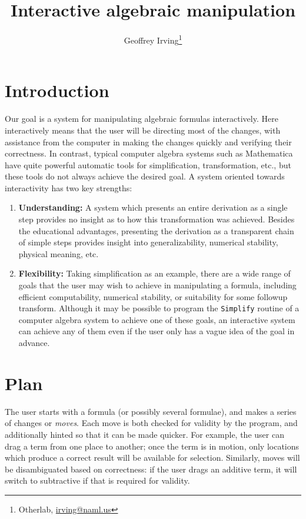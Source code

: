 \documentclass[11pt]{article}
\title{Interactive algebraic manipulation}
\author{Geoffrey Irving\thanks{Otherlab, \url{irving@naml.us}}}
\begin{document}
\maketitle

\section{Introduction}

Our goal is a system for manipulating algebraic formulas interactively.  Here interactively means
that the user will be directing most of the changes, with assistance from the computer in making
the changes quickly and verifying their correctness.  In contrast, typical computer algebra systems
such as Mathematica have quite powerful automatic tools for simplification, transformation, etc., but
these tools do not always achieve the desired goal.  A system oriented towards interactivity has two
key strengths:
\begin{enumerate}
\item {\bf Understanding:} A system which presents an entire derivation as a single step provides no
insight as to how this transformation was achieved.  Besides the educational advantages, presenting
the derivation as a transparent chain of simple steps provides insight into generalizability, numerical
stability, physical meaning, etc.
\item {\bf Flexibility:} Taking simplification as an example, there are a wide range of goals that the
user may wish to achieve in manipulating a formula, including efficient computability, numerical stability,
or suitability for some followup transform.  Although it may be possible to program the \verb+Simplify+
routine of a computer algebra system to achieve one of these goals, an interactive system can achieve any
of them even if the user only has a vague idea of the goal in advance.
\end{enumerate}

\section{Plan}

The user starts with a formula (or possibly several formulae), and makes a series of changes or \emph{moves}.
Each move is both checked for validity by the program, and additionally hinted so that it can be made
quicker.  For example, the user can drag a term from one place to another; once the term is in motion, only
locations which produce a correct result will be available for selection.  Similarly, moves will be disambiguated
based on correctness: if the user drags an additive term, it will switch to subtractive if that is required for
validity.
\end{document}
